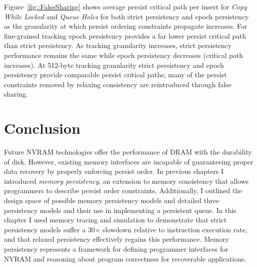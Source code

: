  

Figure~\ref{fig::FalseSharing} shows average persist critical path per insert for \emph{Copy While Locked} and \emph{Queue Holes} for both strict persistency and epoch persistency as the granularity at which persist ordering constraints propagate increases.
For fine-grained tracking epoch persistency provides a far lower persist critical path than strict persistency.
As tracking granularity increases, strict persistency performance remains the same while epoch persistency decreases (critical path increases).
At 512-byte tracking granularity strict persistency and epoch persistency provide comparable persist critical paths; many of the persist constraints removed by relaxing consistency are reintroduced through false sharing.

\section{Conclusion}
\label{sec:PersistencyEval:Conclusion}

Future NVRAM technologies offer the performance of DRAM with the durability of disk.
However, existing memory interfaces are incapable of guaranteeing proper data recovery by properly enforcing persist order.
In previous chapters I introduced \emph{memory persistency}, an extension to memory consistency that allows programmers to describe persist order constraints.
Additionally, I outlined the design space of possible memory persistency models and detailed three persistency models and their use in implementing a persistent queue.
In this chapter I used memory tracing and simulation to demonstrate that strict persistency models suffer a 30$\times$ slowdown relative to instruction execution rate, and that relaxed persistency effectively regains this performance.
Memory persistency represents a framework for defining programmer interfaces for NVRAM and reasoning about program correctness for recoverable applications.
